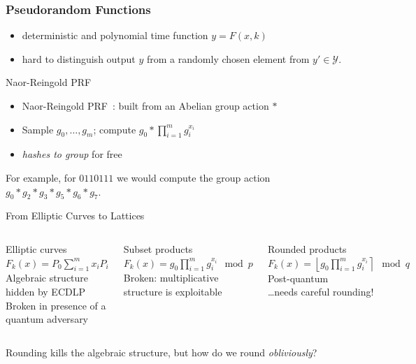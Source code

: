 \documentclass[10pt]{beamer}
\begin{document}
\begin{frame}
  \frametitle{Pseudorandom Functions \cite{C:GolGolMic84,GolGolMic86} }
  \begin{itemize}
    \item deterministic and polynomial time function $y=F(x,k)$\pause
    \item hard to distinguish output $y$ from a randomly chosen element from
      $y'\in\mathcal{Y}$.
  \end{itemize}\pause
  \begin{exampleblock}{Naor-Reingold PRF}
    \begin{itemize}
      \item Naor-Reingold PRF~\cite{NaoRei04}: built from an Abelian group action $*$\pause
      \item Sample $g_0, \ldots, g_m$; compute $g_0 * \prod_{i=1}^m g_i^{x_i}$\pause
      \item \emph{hashes to group} for free\pause
    \end{itemize}
  \end{exampleblock}
  \begin{example}
    For example, for $0110111$ we would
    compute the group action $g_0*g_2*g_3*g_5*g_6*g_7$.
  \end{example}
\end{frame}

\begin{frame}{From Elliptic Curves to Lattices}
  \begin{columns}[T]
    \begin{exampleblock}{Elliptic curves}
      $F_k(x) = P_0 \sum_{i=1}^m x_i P_i$\\[6pt]
      Algebraic structure hidden
      by ECDLP \checkmark
      \alert{Broken} in presence of a quantum adversary
    \end{exampleblock}\pause

    \begin{exampleblock}{Subset products}
      $F_k(x) = g_0 \prod_{i=1}^m g_i^{x_i}\mod p$\\[6pt]
      \alert{Broken}:  multiplicative
      structure is exploitable
    \end{exampleblock}\pause

    \begin{exampleblock}{Rounded products}
      $F_k(x) = \left\lfloor g_0\prod_{i=1}^m
      g_i^{x_i} \right\rceil \mod q$\\[6pt]
      Post-quantum \checkmark\\
      \ldots needs careful rounding!
    \end{exampleblock}\pause
  \end{columns}

  \vspace{1em}
  \centering
  Rounding kills the algebraic structure,
  but how do we round \emph{obliviously}?

\end{frame}
\end{document}
